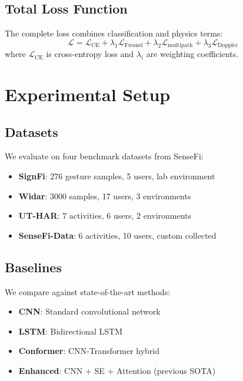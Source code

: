 \documentclass[10pt,conference]{IEEEtran}
\begin{document}
\subsection{Total Loss Function}

The complete loss combines classification and physics terms:
\begin{equation}
    \mathcal{L} = \mathcal{L}_{\text{CE}} + \lambda_1 \mathcal{L}_{\text{Fresnel}} + \lambda_2 \mathcal{L}_{\text{multipath}} + \lambda_3 \mathcal{L}_{\text{Doppler}}
\end{equation}
where $\mathcal{L}_{\text{CE}}$ is cross-entropy loss and $\lambda_i$ are weighting coefficients.

\section{Experimental Setup}
\label{sec:experiments}

\subsection{Datasets}

We evaluate on four benchmark datasets from SenseFi:
\begin{itemize}
    \item \textbf{SignFi}: 276 gesture samples, 5 users, lab environment
    \item \textbf{Widar}: 3000 samples, 17 users, 3 environments
    \item \textbf{UT-HAR}: 7 activities, 6 users, 2 environments
    \item \textbf{SenseFi-Data}: 6 activities, 10 users, custom collected
\end{itemize}

\subsection{Baselines}

We compare against state-of-the-art methods:
\begin{itemize}
    \item \textbf{CNN}: Standard convolutional network
    \item \textbf{LSTM}: Bidirectional LSTM
    \item \textbf{Conformer}: CNN-Transformer hybrid
    \item \textbf{Enhanced}: CNN + SE + Attention (previous SOTA)
\end{itemize}
\end{document}
